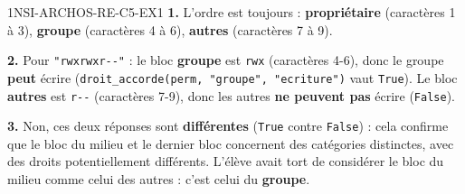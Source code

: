 
\begin{corrige}{1NSI-ARCHOS-RE-C5-EX1}
\textbf{1.} L'ordre est toujours : \textbf{propriétaire} (caractères 1 à 3),
\textbf{groupe} (caractères 4 à 6), \textbf{autres} (caractères 7 à 9).

\textbf{2.} Pour \lstinline{"rwxrwxr--"} : le bloc \textbf{groupe} est
\lstinline{rwx} (caractères 4-6), donc le groupe \textbf{peut} écrire
(\lstinline{droit_accorde(perm, "groupe", "ecriture")} vaut \lstinline{True}). Le bloc
\textbf{autres} est \lstinline{r--} (caractères 7-9), donc les autres \textbf{ne peuvent
pas} écrire (\lstinline{False}).

\textbf{3.} Non, ces deux réponses sont \textbf{différentes} (\lstinline{True} contre
\lstinline{False}) : cela confirme que le bloc du milieu et le dernier bloc concernent des
catégories distinctes, avec des droits potentiellement différents. L'élève avait tort de
considérer le bloc du milieu comme celui des \og autres \fg{} : c'est celui du
\textbf{groupe}.
\end{corrige}
